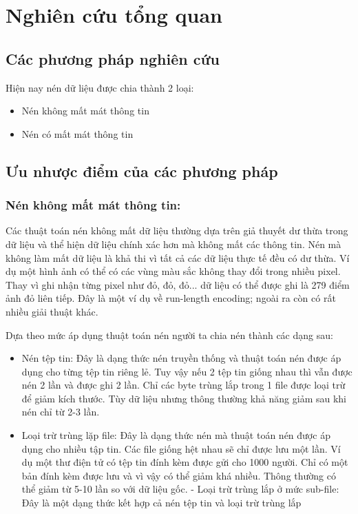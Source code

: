 \chapter{Nghiên cứu tổng quan}
\label{cha: chap1}

\section{Các phương pháp nghiên cứu}

Hiện nay nén dữ liệu được chia thành 2 loại:
\begin{itemize}[leftmargin=1.5cm]
      \item Nén không mất mát thông tin
      \item Nén có mất mát thông tin
\end{itemize}

\section{Ưu nhược điểm của các phương pháp}
\subsection{Nén không mất mát thông tin: }

Các thuật toán nén không mất dữ liệu thường dựa trên giả thuyết dư thừa trong dữ liệu
và thể hiện dữ liệu chính xác hơn mà không mất các thông tin. Nén mà không làm mất dữ
liệu là khả thi vì tất cả các dữ liệu thực tế đều có dư thừa. Ví dụ một hình ảnh có thể
có các vùng màu sắc không thay đổi trong nhiều pixel. Thay vì ghi nhận từng pixel
như đỏ, đỏ, đỏ... dữ liệu có thể được ghi là 279 điểm ảnh đỏ liên tiếp. Đây là một
ví dụ về run-length encoding; ngoài ra còn có rất nhiều giải thuật khác.

Dựa theo mức áp dụng thuật toán nén người ta chia nén thành các dạng sau:
\begin{itemize}[leftmargin=1.5cm]
      \item Nén tệp tin: Đây là dạng thức nén truyền thống và thuật toán nén được
            áp dụng cho từng tệp tin riêng lẻ. Tuy vậy nếu 2 tệp tin giống nhau thì vẫn
            được nén 2 lần và được ghi 2 lần. Chỉ các byte trùng lắp trong 1 file được loại
            trừ để giảm kích thước. Tùy dữ liệu nhưng thông thường khả năng giảm sau khi
            nén chỉ từ 2-3 lần.
      \item Loại trừ trùng lặp file: Đây là dạng thức nén mà thuật toán nén được
            áp dụng cho nhiều tập tin. Các file giống hệt nhau sẽ chỉ được lưu một lần.
            Ví dụ một thư điện tử có tệp tin đính kèm được gửi cho 1000 người. Chỉ có một
            bản đính kèm được lưu và vì vậy có thể giảm khá nhiều. Thông thường có thể giảm
            từ 5-10 lần so với dữ liệu gốc. - Loại trừ trùng lắp ở mức sub-file: Đây là một
            dạng thức kết hợp cả nén tệp tin và loại trừ trùng lắp
\end{itemize}


